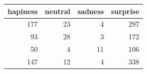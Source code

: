 \begin{tabular}{rrrr}
\toprule
hapiness & neutral & sadness & surprise \\
\midrule
177 & 23 & 4 & 297 \\
93 & 28 & 3 & 172 \\
50 & 4 & 11 & 106 \\
147 & 12 & 4 & 338 \\
\bottomrule
\end{tabular}
